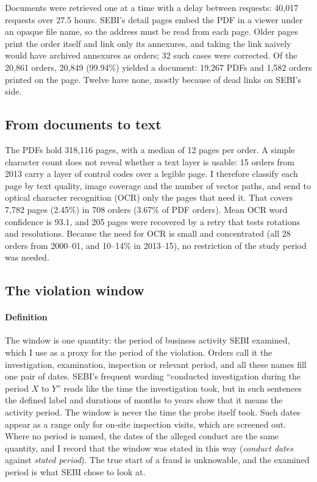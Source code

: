 \documentclass[letterpaper,11pt,leqno]{article}
\begin{document}
Documents were retrieved one at a time with a delay between requests: 40,017 requests over 27.5 hours. SEBI's detail pages embed the PDF in a viewer under an opaque file name, so the address must be read from each page. Older pages print the order itself and link only its annexures, and taking the link naively would have archived annexures as orders; 32 such cases were corrected. Of the 20,861 orders, 20,849 (99.94\%) yielded a document: 19,267 PDFs and 1,582 orders printed on the page. Twelve have none, mostly because of dead links on SEBI's side.

\subsection{From documents to text}

The PDFs hold 318,116 pages, with a median of 12 pages per order. A simple character count does not reveal whether a text layer is usable: 15 orders from 2013 carry a layer of control codes over a legible page. I therefore classify each page by text quality, image coverage and the number of vector paths, and send to optical character recognition (OCR) only the pages that need it. That covers 7,782 pages (2.45\%) in 708 orders (3.67\% of PDF orders). Mean OCR word confidence is 93.1, and 205 pages were recovered by a retry that tests rotations and resolutions. Because the need for OCR is small and concentrated (all 28 orders from 2000--01, and 10--14\% in 2013--15), no restriction of the study period was needed.

\subsection{The violation window}\label{s:window}

\paragraph{Definition} The window is one quantity: the period of business activity SEBI examined, which I use as a proxy for the period of the violation. Orders call it the investigation, examination, inspection or relevant period, and all these names fill one pair of dates. SEBI's frequent wording ``conducted investigation during the period $X$ to $Y$'' reads like the time the investigation took, but in such sentences the defined label and durations of months to years show that it means the activity period. The window is never the time the probe itself took. Such dates appear as a range only for on-site inspection visits, which are screened out. Where no period is named, the dates of the alleged conduct are the same quantity, and I record that the window was stated in this way (\emph{conduct dates} against \emph{stated period}). The true start of a fraud is unknowable, and the examined period is what SEBI chose to look at.
\end{document}
